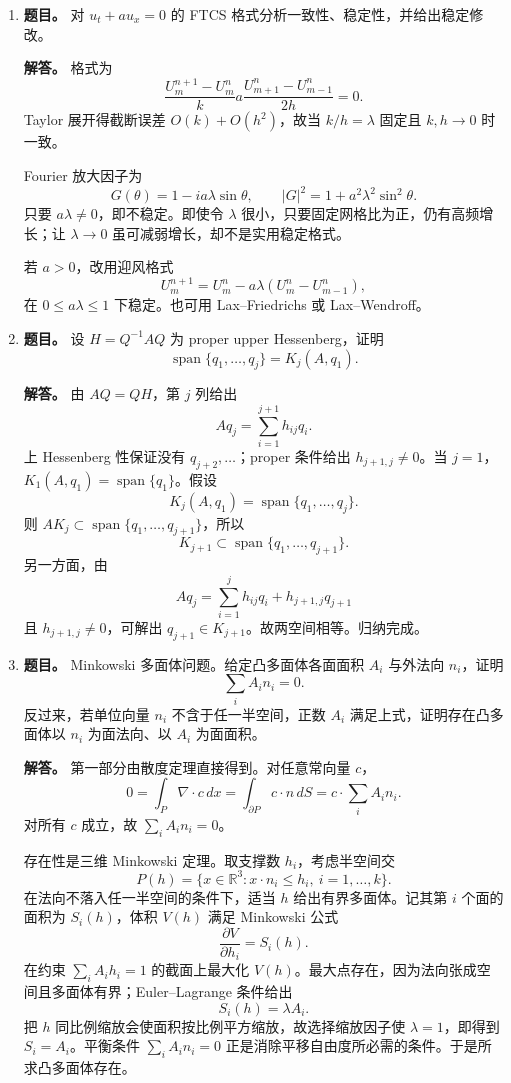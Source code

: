 ﻿\documentclass[UTF8,12pt]{ctexart}
\begin{document}
\begin{enumerate}[label=\textbf{\arabic*.},leftmargin=2.2em]
\item \textbf{题目。} 对 \(u_t+a u_x=0\) 的 FTCS 格式分析一致性、稳定性，并给出稳定修改。

\textbf{解答。} 格式为
\[
\frac{U_m^{n+1}-U_m^n}{k}
a\frac{U_{m+1}^n-U_{m-1}^n}{2h}=0.
\]
Taylor 展开得截断误差 \(O(k)+O(h^2)\)，故当 \(k/h=\lambda\) 固定且 \(k,h\to0\) 时一致。

Fourier 放大因子为
\[
G(\theta)=1-i a\lambda\sin\theta,
\qquad |G|^2=1+a^2\lambda^2\sin^2\theta.
\]
只要 \(a\lambda\ne0\)，即不稳定。即使令 \(\lambda\) 很小，只要固定网格比为正，仍有高频增长；让 \(\lambda\to0\) 虽可减弱增长，却不是实用稳定格式。

若 \(a>0\)，改用迎风格式
\[
U_m^{n+1}=U_m^n-a\lambda(U_m^n-U_{m-1}^n),
\]
在 \(0\le a\lambda\le1\) 下稳定。也可用 Lax--Friedrichs 或 Lax--Wendroff。

\item \textbf{题目。} 设 \(H=Q^{-1}AQ\) 为 proper upper Hessenberg，证明
\[
\operatorname{span}\{q_1,\ldots,q_j\}=K_j(A,q_1).
\]

\textbf{解答。} 由 \(AQ=QH\)，第 \(j\) 列给出
\[
Aq_j=\sum_{i=1}^{j+1}h_{ij}q_i.
\]
上 Hessenberg 性保证没有 \(q_{j+2},\ldots\)；proper 条件给出 \(h_{j+1,j}\ne0\)。当 \(j=1\)，\(K_1(A,q_1)=\operatorname{span}\{q_1\}\)。假设
\[
K_j(A,q_1)=\operatorname{span}\{q_1,\ldots,q_j\}.
\]
则 \(A K_j\subset \operatorname{span}\{q_1,\ldots,q_{j+1}\}\)，所以
\[
K_{j+1}\subset \operatorname{span}\{q_1,\ldots,q_{j+1}\}.
\]
另一方面，由
\[
Aq_j=\sum_{i=1}^{j}h_{ij}q_i+h_{j+1,j}q_{j+1}
\]
且 \(h_{j+1,j}\ne0\)，可解出 \(q_{j+1}\in K_{j+1}\)。故两空间相等。归纳完成。

\item \textbf{题目。} Minkowski 多面体问题。给定凸多面体各面面积 \(A_i\) 与外法向 \(n_i\)，证明
\[
\sum_i A_i n_i=0.
\]
反过来，若单位向量 \(n_i\) 不含于任一半空间，正数 \(A_i\) 满足上式，证明存在凸多面体以 \(n_i\) 为面法向、以 \(A_i\) 为面面积。

\textbf{解答。} 第一部分由散度定理直接得到。对任意常向量 \(c\)，
\[
0=\int_P \nabla\cdot c\,dx=\int_{\partial P}c\cdot n\,dS
=c\cdot\sum_i A_i n_i.
\]
对所有 \(c\) 成立，故 \(\sum_i A_i n_i=0\)。

存在性是三维 Minkowski 定理。取支撑数 \(h_i\)，考虑半空间交
\[
P(h)=\{x\in\mathbb R^3:x\cdot n_i\le h_i,\ i=1,\ldots,k\}.
\]
在法向不落入任一半空间的条件下，适当 \(h\) 给出有界多面体。记其第 \(i\) 个面的面积为 \(S_i(h)\)，体积 \(V(h)\) 满足 Minkowski 公式
\[
\frac{\partial V}{\partial h_i}=S_i(h).
\]
在约束 \(\sum_i A_i h_i=1\) 的截面上最大化 \(V(h)\)。最大点存在，因为法向张成空间且多面体有界；Euler--Lagrange 条件给出
\[
S_i(h)=\lambda A_i.
\]
把 \(h\) 同比例缩放会使面积按比例平方缩放，故选择缩放因子使 \(\lambda=1\)，即得到 \(S_i=A_i\)。平衡条件 \(\sum_iA_in_i=0\) 正是消除平移自由度所必需的条件。于是所求凸多面体存在。
\end{enumerate}
\end{document}

